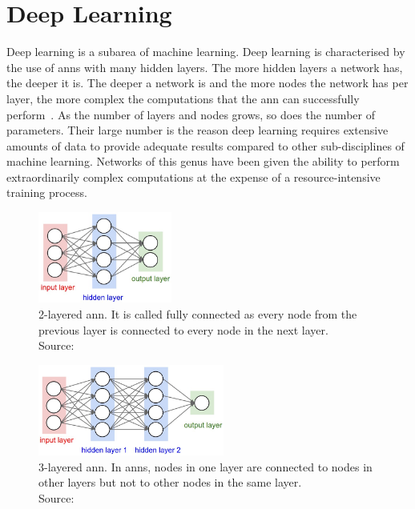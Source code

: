 \documentclass[
			   fontsize=11pt,
               paper=a4,
               bibliography=totoc,
               idxtotoc,
               headsepline,
               footsepline,
               footinclude=false,
               BCOR=12mm,
               DIV=13,
               openany,   %
               ]
               {scrbook}
\begin{document}

\section{Deep Learning}

Deep learning is a subarea of machine learning. Deep learning is characterised by the use of \glspl{ann} with many hidden layers. The more hidden layers a network has, the deeper it is. The deeper a network is and the more nodes the network has per layer, the more complex the computations that the \gls{ann} can successfully perform~\cite{dlBookGoodf}. As the number of layers and nodes grows, so does the number of parameters. Their large number is the reason deep learning requires extensive amounts of data to provide adequate results compared to other sub-disciplines of machine learning. Networks of this genus have been given the ability to perform extraordinarily complex computations at the expense of a resource-intensive training process.

\begin{multicols}{2} %
	\begin{figure}[H] %
		\centering
		\includegraphics[height=3cm]{figures/ann1.jpeg}
		\caption[2-Layered ANN]{2-layered \gls{ann}. It is called fully connected as every node from the previous layer is connected to every node in the next layer. \\
			\tiny{Source:~\cite{annGraphics}}}
		\label{fig:2layeredANN} %
	\end{figure}
	
	\columnbreak    %
	
	\begin{figure}[H] %
		\centering
		\includegraphics[height=3cm]{figures/ann2.jpeg}
		\caption[3-Layered ANN]{3-layered \gls{ann}. In \glspl{ann}, nodes in one layer are connected to nodes in other layers but not to other nodes in the same layer. \\
			\tiny{Source:~\cite{annGraphics}}}
		\label{fig:3layeredANN} %
	\end{figure}
\end{multicols}
\end{document}
